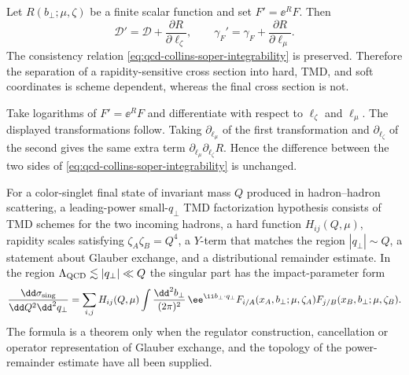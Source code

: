 \begin{remark}
\label{rem:qcd-tmd-finite-scheme-change}
Let \(R(b_\perp;\mu,\zeta)\) be a finite scalar function and set
\(F'=\ee^R F\).  Then
\[
  \mathcal D'=\mathcal D+\frac{\partial R}{\partial\ell_\zeta},
  \qquad
  \gamma_F'=\gamma_F+\frac{\partial R}{\partial\ell_\mu}.
\]
The consistency relation
\eqref{eq:qcd-collins-soper-integrability} is preserved.  Therefore the
separation of a rapidity-sensitive cross section into hard, TMD, and soft
coordinates is scheme dependent, whereas the final cross section is not.
\par
Take logarithms of \(F'=\ee^R F\) and differentiate with respect to
\(\ell_\zeta\) and \(\ell_\mu\).  The displayed transformations follow.  Taking
\(\partial_{\ell_\mu}\) of the first transformation and
\(\partial_{\ell_\zeta}\) of the second gives the same extra term
\(\partial_{\ell_\mu}\partial_{\ell_\zeta}R\).  Hence the difference between
the two sides of
\eqref{eq:qcd-collins-soper-integrability} is unchanged.
\end{remark}

\begin{hypothesis}
\label{hyp:qcd-tmd-factorization-hypothesis}
For a color-singlet final state of invariant mass \(Q\) produced in
hadron--hadron scattering, a leading-power small-\(q_\perp\) TMD
factorization hypothesis consists of TMD schemes for the two incoming hadrons, a
hard function \(H_{ij}(Q,\mu)\), rapidity scales satisfying
\(\zeta_A\zeta_B=Q^4\), a \(Y\)-term that matches the region
\(|q_\perp|\sim Q\), a statement about Glauber exchange, and a distributional
remainder estimate.  In the region
\(\Lambda_{\rm QCD}\lesssim |q_\perp|\ll Q\) the singular part has the
impact-parameter form
\begin{equation}
  \frac{\dd\sigma_{\rm sing}}{\dd Q^2\dd^2q_\perp}
  =
  \sum_{i,j}
  H_{ij}(Q,\mu)
  \int\frac{\dd^2 b_\perp}{(2\pi)^2}\,
  \ee^{\ii b_\perp\cdot q_\perp}
  F_{i/A}(x_A,b_\perp;\mu,\zeta_A)
  F_{j/B}(x_B,b_\perp;\mu,\zeta_B).
  \label{eq:qcd-tmd-factorization}
\end{equation}
The formula is a theorem only when the regulator construction, cancellation or
operator representation of Glauber exchange, and the topology of the
power-remainder estimate have all been supplied.
\end{hypothesis}


